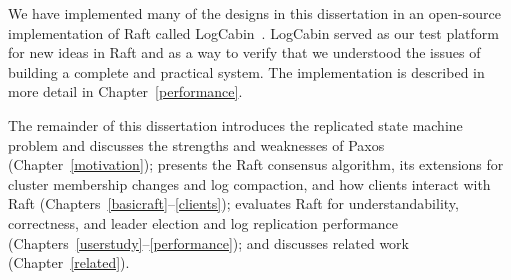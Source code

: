 We have implemented many of the designs in this dissertation in
an open-source implementation of Raft called LogCabin~\cite{logcabin}.
LogCabin served as our test platform for new ideas in Raft
and as a way to verify that we understood the issues of building a
complete and practical system. The implementation is described in more
detail in Chapter~\ref{performance}.

The remainder of this dissertation introduces the replicated state
machine problem and discusses the strengths and weaknesses of Paxos
(Chapter~\ref{motivation}); presents the Raft consensus algorithm, 
its extensions for cluster membership changes and log compaction, and
how clients interact with Raft
(Chapters~\ref{basicraft}--\ref{clients});
evaluates Raft for understandability, correctness, and leader election
and log replication performance
(Chapters~\ref{userstudy}--\ref{performance}); and discusses related
work (Chapter~\ref{related}).
